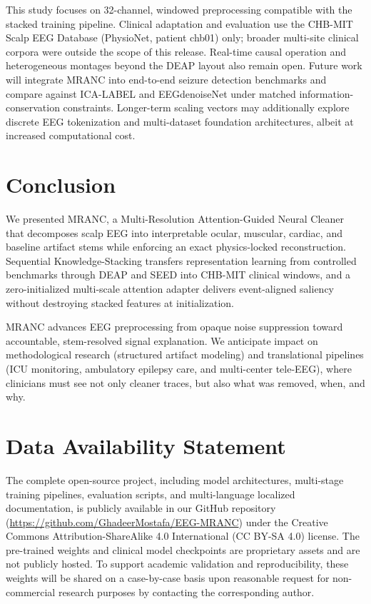 \documentclass[journal,twocolumn]{IEEEtran}
\begin{document}
This study focuses on 32-channel, windowed preprocessing compatible with the stacked training pipeline. Clinical adaptation and evaluation use the CHB-MIT Scalp EEG Database (PhysioNet, patient chb01) only; broader multi-site clinical corpora were outside the scope of this release. Real-time causal operation and heterogeneous montages beyond the DEAP layout also remain open. Future work will integrate MRANC into end-to-end seizure detection benchmarks \cite{shoeb2010chb} and compare against ICA-LABEL and EEGdenoiseNet \cite{zhang2022eegdenoisenet} under matched information-conservation constraints. Longer-term scaling vectors may additionally explore discrete EEG tokenization and multi-dataset foundation architectures, albeit at increased computational cost.

\section{Conclusion}\label{sec:conclusion}
We presented MRANC, a Multi-Resolution Attention-Guided Neural Cleaner that decomposes scalp EEG into interpretable ocular, muscular, cardiac, and baseline artifact stems while enforcing an exact physics-locked reconstruction. Sequential Knowledge-Stacking transfers representation learning from controlled benchmarks through DEAP and SEED into CHB-MIT clinical windows, and a zero-initialized multi-scale attention adapter delivers event-aligned saliency without destroying stacked features at initialization.

MRANC advances EEG preprocessing from opaque noise suppression toward accountable, stem-resolved signal explanation. We anticipate impact on methodological research (structured artifact modeling) and translational pipelines (ICU monitoring, ambulatory epilepsy care, and multi-center tele-EEG), where clinicians must see not only cleaner traces, but also what was removed, when, and why.

\section*{Data Availability Statement}

The complete open-source project, including model architectures, multi-stage training pipelines, evaluation scripts, and multi-language localized documentation, is publicly available in our GitHub repository (\url{https://github.com/GhadeerMostafa/EEG-MRANC}) under the Creative Commons Attribution-ShareAlike 4.0 International (CC BY-SA 4.0) license. The pre-trained weights and clinical model checkpoints are proprietary assets and are not publicly hosted. To support academic validation and reproducibility, these weights will be shared on a case-by-case basis upon reasonable request for non-commercial research purposes by contacting the corresponding author.
\end{document}
